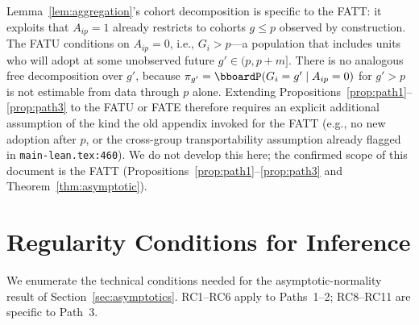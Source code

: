 \documentclass{article}
\renewcommand{\P}{\bboardP}
\begin{document}
\begin{remark}
\label{rem:fatu-scope}
Lemma~\ref{lem:aggregation}'s cohort decomposition is specific to the FATT: it exploits that $A_{ip}=1$ already restricts to cohorts $g\leq p$ observed by construction. The FATU conditions on $A_{ip}=0$, i.e., $G_i > p$---a population that includes units who will adopt at some unobserved future $g' \in (p,p+m]$. There is no analogous free decomposition over $g'$, because $\pi_{g'} = \P(G_i=g'\mid A_{ip}=0)$ for $g' > p$ is not estimable from data through $p$ alone. Extending Propositions~\ref{prop:path1}--\ref{prop:path3} to the FATU or FATE therefore requires an explicit additional assumption of the kind the old appendix invoked for the FATT (e.g., no new adoption after $p$, or the cross-group transportability assumption already flagged in \texttt{main-lean.tex:460}). We do not develop this here; the confirmed scope of this document is the FATT (Propositions~\ref{prop:path1}--\ref{prop:path3} and Theorem~\ref{thm:asymptotic}).
\end{remark}

\section{Regularity Conditions for Inference}
\label{sec:regularity}

We enumerate the technical conditions needed for the asymptotic-normality result of Section~\ref{sec:asymptotics}. RC1--RC6 apply to Paths~1--2; RC8--RC11 are specific to Path~3.
\end{document}
